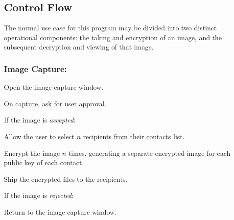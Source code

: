 \documentclass[11pt, a4paper,titlepage]{report}
\begin{document}
\subsection*{Control Flow}
The normal use case for this program may be divided into two distinct operational components: the taking and encryption of an image, and the subsequent decryption and viewing of that image.

\subsubsection{Image Capture:}
\begin{itemize*}
	\item Open the image capture window.
	\item On capture, ask for user approval.
	\begin{itemize*}
		\item[] If the image is \emph{accepted}:
		\begin{itemize*}
			\item Allow the user to select $n$ recipients from their contacts list.
			\item Encrypt the image $n$ times, generating a separate encrypted image for each public key of each contact.
			\item Ship the encrypted files to the recipients.
		\end{itemize*}
		\item[] If the image is \emph{rejected}:
		\begin{itemize*}
			\item Return to the image capture window.
		\end{itemize*}
	\end{itemize*}
\end{itemize*}
\end{document}
